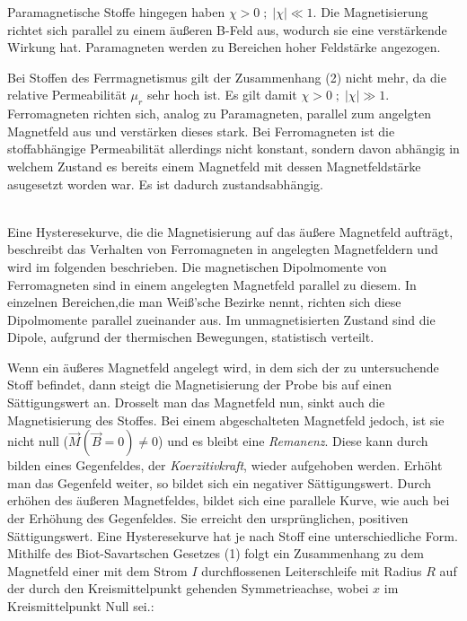 Paramagnetische Stoffe hingegen haben $\chi > 0\; ; \;|\chi|\ll 1$. Die Magnetisierung richtet sich parallel zu einem äußeren B-Feld aus,
wodurch sie eine verstärkende Wirkung hat. Paramagneten werden zu Bereichen hoher Feldstärke angezogen.

Bei Stoffen des Ferrmagnetismus gilt der Zusammenhang (2) nicht mehr, da die relative Permeabilität $\mu_r$ sehr hoch ist. Es gilt damit
$\chi > 0\; ; \;|\chi|\gg 1$. Ferromagneten richten sich, analog zu Paramagneten, parallel zum angelgten Magnetfeld aus und verstärken dieses
stark. 
Bei Ferromagneten ist die stoffabhängige Permeabilität allerdings nicht konstant, sondern davon abhängig in welchem Zustand es bereits
einem Magnetfeld mit dessen Magnetfeldstärke asugesetzt worden war. Es ist dadurch zustandsabhängig.

\\
Eine Hysteresekurve, die die Magnetisierung auf das äußere Magnetfeld aufträgt, beschreibt das Verhalten von Ferromagneten in
angelegten Magnetfeldern und wird im folgenden beschrieben. 
Die magnetischen Dipolmomente von Ferromagneten sind in einem angelegten
Magnetfeld parallel zu diesem. In einzelnen Bereichen,die man Weiß'sche Bezirke nennt, richten sich diese Dipolmomente parallel zueinander aus.
Im unmagnetisierten Zustand sind die Dipole, aufgrund der thermischen Bewegungen, statistisch verteilt.




Wenn ein äußeres Magnetfeld angelegt wird, in dem sich der zu untersuchende Stoff befindet, dann steigt die Magnetisierung der Probe bis
auf einen Sättigungswert an. Drosselt man das Magnetfeld nun, sinkt auch die Magnetisierung des Stoffes. Bei einem abgeschalteten Magnetfeld jedoch,
ist sie nicht null ($\vec M(\vec B = 0)\neq0$) und es bleibt eine \textit{Remanenz}.
Diese kann durch bilden eines Gegenfeldes, der \textit{Koerzitivkraft}, wieder aufgehoben werden. Erhöht man das Gegenfeld weiter, so bildet sich ein 
negativer Sättigungswert.
Durch erhöhen des äußeren Magnetfeldes, bildet sich eine parallele Kurve, wie auch bei der Erhöhung des Gegenfeldes. Sie erreicht den
ursprünglichen, positiven Sättigungswert. Eine Hysteresekurve hat je nach Stoff eine unterschiedliche Form.
\\

Mithilfe des Biot-Savartschen Gesetzes (1) folgt ein Zusammenhang zu dem Magnetfeld einer mit dem Strom $I$ durchflossenen 
Leiterschleife mit Radius $R$ auf der durch den Kreismittelpunkt gehenden Symmetrieachse, wobei $x$ im Kreismittelpunkt Null sei.:


